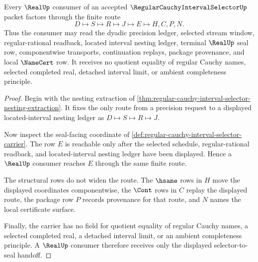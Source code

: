 \begin{theorem}
\label{thm:regular-cauchy-interval-selector-real-seal-handoff}
Every $\RealUp$ consumer of an accepted $\RegularCauchyIntervalSelectorUp$ packet factors through the finite route
$$
D \longmapsto S \longmapsto R \longmapsto J \longmapsto E \longmapsto H,C,P,N.
$$
Thus the consumer may read the dyadic precision ledger, selected stream window, regular-rational readback, located interval nesting ledger, terminal $\RealUp$ seal row, componentwise transports, continuation replays, package provenance, and local $\NameCert$ row. It receives no quotient equality of regular Cauchy names, selected completed real, detached interval limit, or ambient completeness principle.
\end{theorem}
\begin{proof}
Begin with the nesting extraction of \autoref{thm:regular-cauchy-interval-selector-nesting-extraction}. It fixes the only route from a precision request to a displayed located-interval nesting ledger as $D \mapsto S \mapsto R \mapsto J$.

Now inspect the seal-facing coordinate of \autoref{def:regular-cauchy-interval-selector-carrier}. The row $E$ is reachable only after the selected schedule, regular-rational readback, and located-interval nesting ledger have been displayed. Hence a $\RealUp$ consumer reaches $E$ through the same finite route.

The structural rows do not widen the route. The $\hsame$ rows in $H$ move the displayed coordinates componentwise, the $\Cont$ rows in $C$ replay the displayed route, the package row $P$ records provenance for that route, and $N$ names the local certificate surface.

Finally, the carrier has no field for quotient equality of regular Cauchy names, a selected completed real, a detached interval limit, or an ambient completeness principle. A $\RealUp$ consumer therefore receives only the displayed selector-to-seal handoff.
\end{proof}

